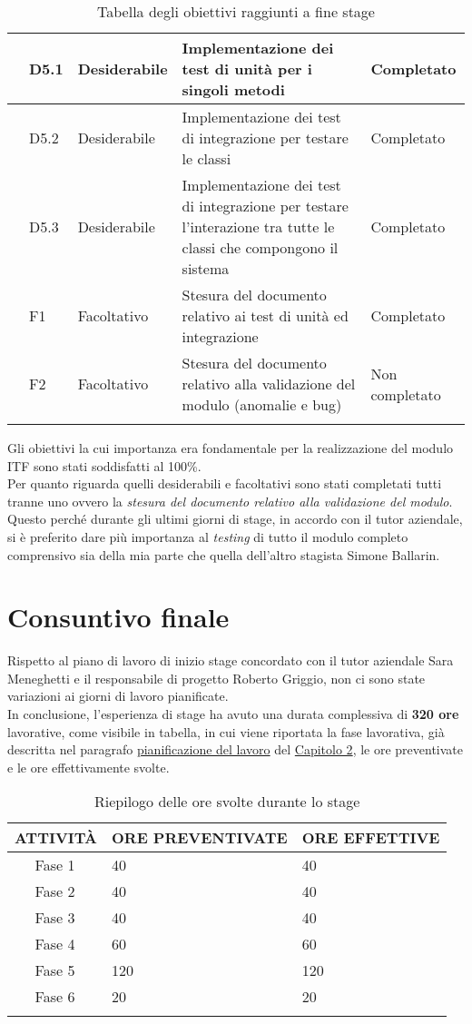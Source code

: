 \begin{longtable}{|r l|p{3cm}|p{8cm}|p{2cm}|}
	& D5.1 & Desiderabile & Implementazione dei test di unità per i singoli metodi & Completato\\\hline
	& D5.2 & Desiderabile & Implementazione dei test di integrazione per testare le classi & Completato\\\hline
	& D5.3 & Desiderabile & Implementazione dei test di integrazione per testare l'interazione tra tutte le classi che compongono il sistema & Completato\\\hline
	& F1 & Facoltativo & Stesura del documento relativo ai test di unità ed integrazione & Completato\\\hline	
	& F2 & Facoltativo & Stesura del documento relativo alla validazione del modulo (anomalie e bug) & Non completato\\\hline
	\caption{Tabella degli obiettivi raggiunti a fine stage}
\end{longtable}
Gli obiettivi la cui importanza era fondamentale per la realizzazione del modulo \gls{ITF} sono stati soddisfatti al 100\%.\\
Per quanto riguarda quelli desiderabili e facoltativi sono stati completati tutti tranne uno ovvero la\textit{ stesura del documento relativo alla validazione del modulo}. Questo perché durante gli ultimi giorni di stage, in accordo con il tutor aziendale, si è preferito dare più importanza al \textit{testing} di tutto il modulo completo comprensivo sia della mia parte che quella dell'altro stagista Simone Ballarin.
\section{Consuntivo finale}
Rispetto al piano di lavoro di inizio stage concordato con il tutor aziendale Sara Meneghetti e il responsabile di progetto Roberto Griggio, non ci sono state variazioni ai giorni di lavoro pianificate.\\
In conclusione, l'esperienza di stage ha avuto una durata complessiva di \textbf{320 ore} lavorative, come visibile in tabella, in cui viene riportata la fase lavorativa, già descritta nel paragrafo \hyperref[sec:pianificazione_del_lavoro]{pianificazione del lavoro} del \hyperref[cap:tecnologie_e_strumenti]{Capitolo 2}, le ore preventivate e le ore effettivamente svolte. 
\begin{longtable}{|r l|p{5cm}|p{4cm}|}
	\hline
	\multicolumn{2}{|c|}{\textbf{ATTIVITÀ}} & \textbf{ORE PREVENTIVATE} & \textbf{ORE EFFETTIVE}\tabularnewline
	\hline
	& Fase 1 & \centerline{40} & \centerline{40} \\\hline	
	& Fase 2 & \centerline{40} & \centerline{40}\\\hline
	& Fase 3 & \centerline{40} & \centerline{40}\\\hline
	& Fase 4 & \centerline{60} & \centerline{60}\\\hline
	& Fase 5 & \centerline{120} & \centerline{120}\\\hline
	& Fase 6 & \centerline{20} & \centerline{20}\\\hline	
	\caption{Riepilogo delle ore svolte durante lo stage}
\end{longtable}
